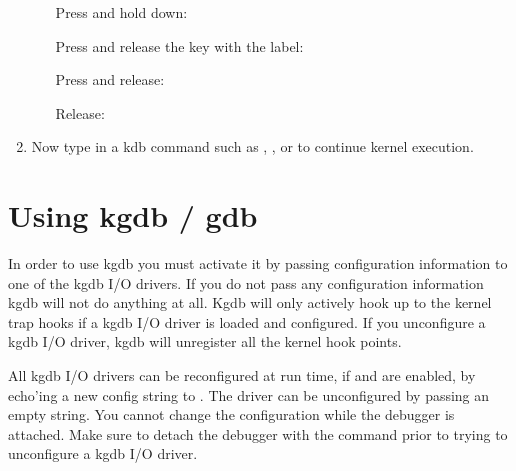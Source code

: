 \documentclass[a4paper,8pt,english]{sphinxmanual}
\begin{document}
\begin{enumerate}
\begin{itemize}
Press and hold down: 

Press and release the key with the label: 

Press and release: 

Release: 

\end{itemize}

\item {} 
Now type in a kdb command such as , ,  or  to
continue kernel execution.

\end{enumerate}


\section{Using kgdb / gdb}
\label{dev-tools/kgdb:using-kgdb-gdb}
In order to use kgdb you must activate it by passing configuration
information to one of the kgdb I/O drivers. If you do not pass any
configuration information kgdb will not do anything at all. Kgdb will
only actively hook up to the kernel trap hooks if a kgdb I/O driver is
loaded and configured. If you unconfigure a kgdb I/O driver, kgdb will
unregister all the kernel hook points.

All kgdb I/O drivers can be reconfigured at run time, if
 and  are enabled, by echo'ing a new
config string to . The driver
can be unconfigured by passing an empty string. You cannot change the
configuration while the debugger is attached. Make sure to detach the
debugger with the  command prior to trying to unconfigure a
kgdb I/O driver.
\end{document}
